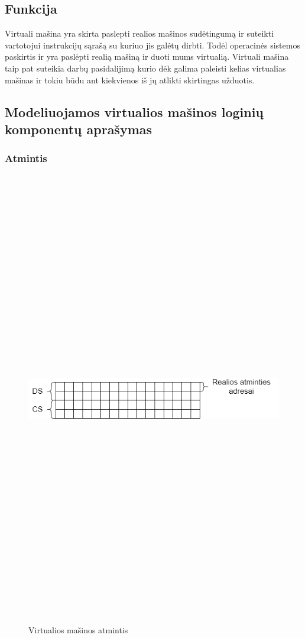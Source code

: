 \documentclass[oneside]{VUMIFPSkursinis}
\begin{document}
\subsection{Funkcija}
Virtuali mašina yra skirta paslepti realios mašinos sudėtingumą ir suteikti vartotojui instrukcijų sąrašą su kuriuo jis galėtų dirbti. Todėl operacinės sistemos paskirtis ir yra paslėpti realią mašiną ir duoti mums virtualią. Virtuali mašina taip pat suteikia darbų pasidalijimą kurio dėk galima paleisti kelias virtualias mašinas ir tokiu būdu ant kiekvienos iš jų atlikti skirtingas užduotis.

 \subsection{Modeliuojamos virtualios mašinos loginių komponentų aprašymas}
	\subsubsection{Atmintis}
	\begin{figure}[H]
		\centering	
	\includegraphics[width=18cm,height=20cm,keepaspectratio]{VMAtmintis.png}
	\caption{Virtualios mašinos atmintis}
	\label{fig:Virtualios mašinos atmintis}
\end{figure}
\end{document}
